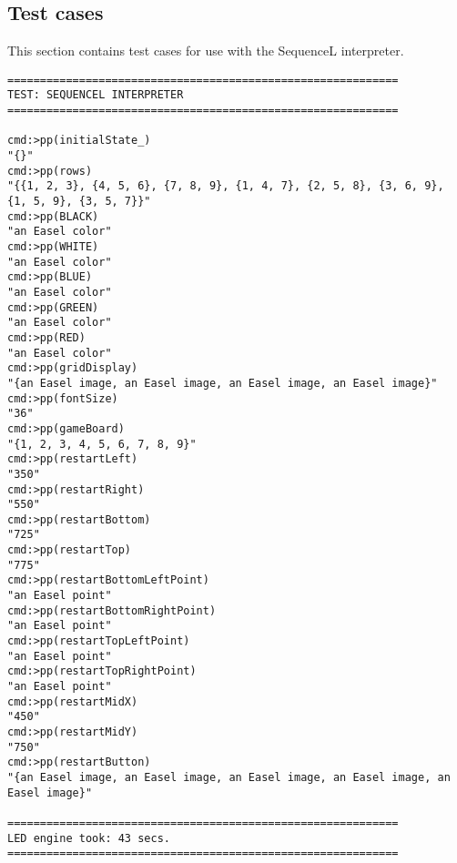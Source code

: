 \documentclass{led_doc}
\begin{document}
\begin{ledCmnt}
\section{Test cases}

This section contains test cases for use with the SequenceL interpreter.

\begin{verbatim}
============================================================
TEST: SEQUENCEL INTERPRETER
============================================================

cmd:>pp(initialState_)
"{}"
cmd:>pp(rows)
"{{1, 2, 3}, {4, 5, 6}, {7, 8, 9}, {1, 4, 7}, {2, 5, 8}, {3, 6, 9}, {1, 5, 9}, {3, 5, 7}}"
cmd:>pp(BLACK)
"an Easel color"
cmd:>pp(WHITE)
"an Easel color"
cmd:>pp(BLUE)
"an Easel color"
cmd:>pp(GREEN)
"an Easel color"
cmd:>pp(RED)
"an Easel color"
cmd:>pp(gridDisplay)
"{an Easel image, an Easel image, an Easel image, an Easel image}"
cmd:>pp(fontSize)
"36"
cmd:>pp(gameBoard)
"{1, 2, 3, 4, 5, 6, 7, 8, 9}"
cmd:>pp(restartLeft)
"350"
cmd:>pp(restartRight)
"550"
cmd:>pp(restartBottom)
"725"
cmd:>pp(restartTop)
"775"
cmd:>pp(restartBottomLeftPoint)
"an Easel point"
cmd:>pp(restartBottomRightPoint)
"an Easel point"
cmd:>pp(restartTopLeftPoint)
"an Easel point"
cmd:>pp(restartTopRightPoint)
"an Easel point"
cmd:>pp(restartMidX)
"450"
cmd:>pp(restartMidY)
"750"
cmd:>pp(restartButton)
"{an Easel image, an Easel image, an Easel image, an Easel image, an Easel image}"

============================================================
LED engine took: 43 secs.
============================================================

\end{verbatim}
\end{ledCmnt}

\hrulefill
\end{document}
